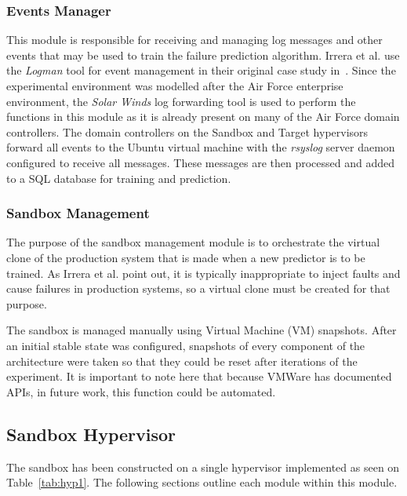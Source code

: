 \subsubsection{Events Manager} \label{sec:eventsManagerMgr}
This module is responsible for receiving and managing log messages and other
events that may be used to train the failure prediction algorithm.  Irrera et
al. use the \emph{Logman} tool for event management in their original case
study in~\cite{irrera2015}.  Since the experimental environment was modelled
after the Air Force enterprise environment, the \emph{Solar Winds} log
forwarding tool is used to perform the functions in this module as it is
already present on many of the Air Force domain controllers.  The domain
controllers on the Sandbox and Target hypervisors forward all events to the
Ubuntu virtual machine with the \emph{rsyslog} server daemon configured to
receive all messages.  These messages are then processed and added to a SQL
database for training and prediction.  

\subsubsection{Sandbox Management} \label{sec:sandboxMgr} 
The purpose of the sandbox management module is to orchestrate the virtual
clone of the production system that is made when a new predictor is to be
trained.  As Irrera et al. point out, it is typically inappropriate to inject
faults and cause failures in production systems, so a virtual clone must be
created for that purpose.

The sandbox is managed manually using Virtual Machine (VM) snapshots.  After an
initial stable state was configured, snapshots of every component of the
architecture were taken so that they could be reset after iterations of the
experiment.  It is important to note here that because VMWare has documented
APIs, in future work, this function could be automated.

\subsection{Sandbox Hypervisor} \label{sec:sandbox}
The sandbox has been constructed on a single hypervisor implemented as seen on
Table~\ref{tab:hyp1}.  The following sections outline each module within this
module.

